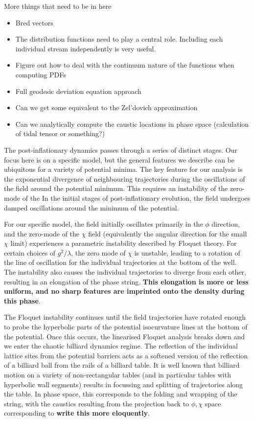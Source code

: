\documentclass[11pt,a4paper]{article}
\begin{document}
More things that need to be in here
\begin{itemize}
\item Bred vectors
\item The distribution functions need to play a central role.  Including each individual stream independently is very useful.
\item Figure out how to deal with the continuum nature of the functions when computing PDFs
\item Full geodesic deviation equation approach
\item Can we get some equivalent to the Zel'dovich approximation
\item Can we analytically compute the caustic locations in phase space (calculation of tidal tensor or something?)
\end{itemize}

The post-inflationary dynamics passes through a series of distinct stages.
Our focus here is on a specific model, but the general features we describe can be ubiquitous for a variety of potential minima.
The key feature for our analysis is the exponential divergence of neighbouring trajectories during the oscillations of the field around the potential minimum.
This requires an instability of the zero-mode of the 
In the initial stages of post-inflationary evolution, the field undergoes damped oscillations around the minimum of the potential.

For our specific model, the field initially oscillates primarily in the $\phi$ direction, and the zero-mode of the $\chi$ field (equivalently the angular direction for the small $\chi$ limit) experiences a parametric instability described by Floquet theory.
For certain choices of $g^2/\lambda$, the zero mode of $\chi$ is unstable, leading to a rotation of the line of oscillation for the individual trajectories at the bottom of the well.
The instability also causes the individual trajectories to diverge from each other, resulting in an elongation of the phase string.
{\bf This elongation is more or less uniform, and no sharp features are imprinted onto the density during this phase}.

The Floquet instability continues until the field trajectories have rotated enough to probe the hyperbolic parts of the potential isocurvature lines at the bottom of the potential.
Once this occurs, the linearised Floquet analysis breaks down and we enter the chaotic billiard dynamics regime.
The reflection of the individual lattice sites from the potential barriers acts as a softened version of the reflection of a billiard ball from the rails of a billiard table.
It is well known that billiard motion on a variety of non-rectangular tables (and in particular tables with hyperbolic wall segments) results in focussing and splitting of trajectories along the table.
In phase space, this corresponds to the folding and wrapping of the string, with the caustics resulting from the projection back to $\phi,\chi$ space corresponding to {\bf write this more eloquently}.
\end{document}
